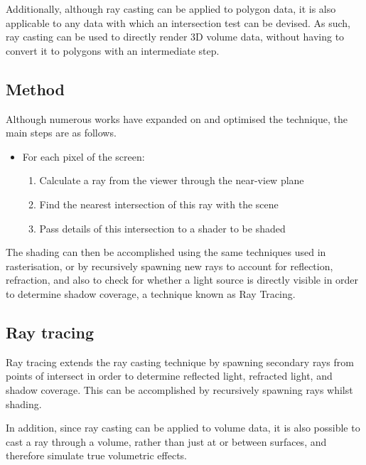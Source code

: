 Additionally, although ray casting can be applied to polygon data, it is also applicable to any data with which an intersection test can be devised. As such, ray casting can be used to directly render 3D volume data, without having to convert it to polygons with an intermediate step.

\subsection{Method}
Although numerous works have expanded on and optimised the technique, the main steps are as follows.

\let\oldlabelitemi\labelitemi
\renewcommand{\labelitemi}{}

\begin{itemize}
	\item For each pixel of the screen:

	\begin{enumerate}
		\item Calculate a ray from the viewer through the near-view plane
		\item Find the nearest intersection of this ray with the scene
		\item Pass details of this intersection to a shader to be shaded
	\end{enumerate}
\end{itemize}

\let\labelitemi\oldlabelitemi

The shading can then be accomplished using the same techniques used in rasterisation, or by recursively spawning new rays to account for reflection, refraction, and also to check for whether a light source is directly visible in order to determine shadow coverage, a technique known as Ray Tracing.

\subsection{Ray tracing}
Ray tracing extends the ray casting technique by spawning secondary rays from points of intersect in order to determine reflected light, refracted light, and shadow coverage. This can be accomplished by recursively spawning rays whilst shading.

In addition, since ray casting can be applied to volume data, it is also possible to cast a ray through a volume, rather than just at or between surfaces, and therefore simulate true volumetric effects.

